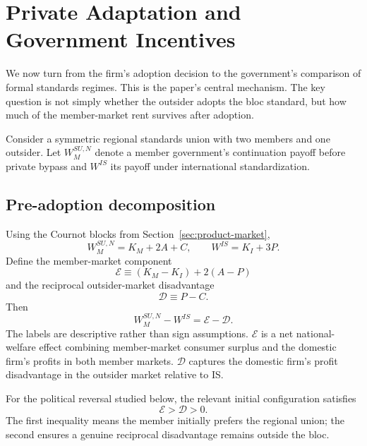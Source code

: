\section{Private Adaptation and Government Incentives}
\label{sec:selective-erosion}

We now turn from the firm's adoption decision to the government's comparison of formal standards regimes. This is the paper's central mechanism. The key question is not simply whether the outsider adopts the bloc standard, but how much of the member-market rent survives after adoption.

Consider a symmetric regional standards union with two members and one outsider. Let $W_M^{SU,N}$ denote a member government's continuation payoff before private bypass and $W^{IS}$ its payoff under international standardization.

\subsection{Pre-adoption decomposition}
\label{subsec:selective-decomposition}

Using the Cournot blocks from Section~\ref{sec:product-market},
\begin{equation}
    W_M^{SU,N}=K_M+2A+C,
    \qquad
    W^{IS}=K_I+3P.
    \label{eq:canonical-welfare-pairs}
\end{equation}
Define the member-market component
\begin{equation}
    \mathscr E
    \equiv
    (K_M-K_I)+2(A-P)
    \label{eq:exclusion-surplus}
\end{equation}
and the reciprocal outsider-market disadvantage
\begin{equation}
    \mathscr D
    \equiv
    P-C.
    \label{eq:reciprocal-disadvantage}
\end{equation}
Then
\begin{equation}
    \boxed{
    W_M^{SU,N}-W^{IS}
    =\mathscr E-\mathscr D.
    }
    \label{eq:selective-before}
\end{equation}
The labels are descriptive rather than sign assumptions. $\mathscr E$ is a net national-welfare effect combining member-market consumer surplus and the domestic firm's profits in both member markets. $\mathscr D$ captures the domestic firm's profit disadvantage in the outsider market relative to IS.

For the political reversal studied below, the relevant initial configuration satisfies
\begin{equation}
    \mathscr E>\mathscr D>0.
    \label{eq:initial-preference-condition}
\end{equation}
The first inequality means the member initially prefers the regional union; the second ensures a genuine reciprocal disadvantage remains outside the bloc.

